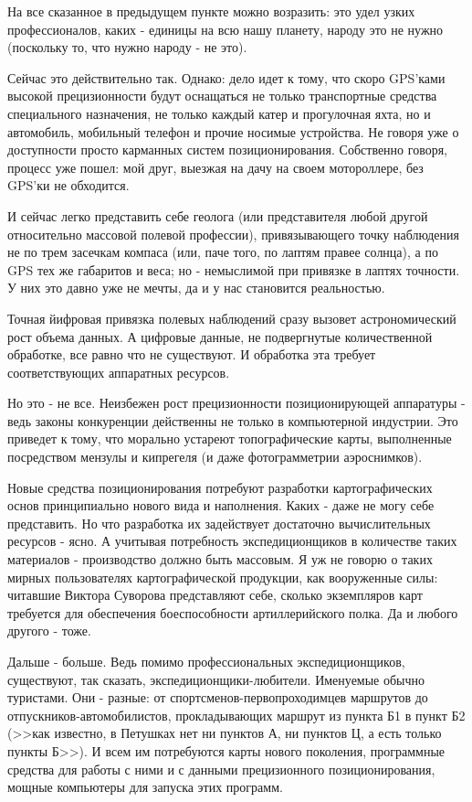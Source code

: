 На все сказанное в предыдущем пункте можно возразить: это удел узких профессионалов, каких - единицы на всю нашу планету, народу это не нужно (поскольку то, что нужно народу - не это).

Сейчас это действительно так. Однако: дело идет к тому, что скоро GPS'ками высокой прецизионности будут оснащаться не только транспортные средства специального назначения, не только каждый катер и прогулочная яхта, но и автомобиль, мобильный телефон и прочие носимые устройства. Не говоря уже о доступности просто карманных систем позиционирования. Собственно говоря, процесс уже пошел: мой друг, выезжая на дачу на своем мотороллере, без GPS'ки не обходится.

И сейчас легко представить себе геолога (или представителя любой другой относительно массовой полевой профессии), привязывающего точку наблюдения не по трем засечкам компаса (или, паче того, по лаптям правее солнца), а по GPS тех же габаритов и веса; но - немыслимой при привязке в лаптях точности. У них это давно уже не мечты, да и у нас становится реальностью.

Точная йифровая привязка полевых наблюдений сразу вызовет астрономический рост объема данных. А цифровые данные, не подвергнутые количественной обработке, все равно что не существуют. И обработка эта требует соответствующих аппаратных ресурсов.

Но это - не все. Неизбежен рост прецизионности позиционирующей аппаратуры - ведь законы конкуренции действенны не только в компьютерной индустрии. Это приведет к тому, что морально устареют топографические карты, выполненные посредством мензулы и кипрегеля (и даже фотограмметрии аэроснимков).

Новые средства позиционирования потребуют разработки картографических основ принципиально нового вида и наполнения. Каких - даже не могу себе представить. Но что разработка их задействует достаточно вычислительных ресурсов - ясно. А учитывая потребность экспедиционщиков в количестве таких материалов - производство должно быть массовым. Я уж не говорю о таких мирных пользователях картографической продукции, как вооруженные силы: читавшие Виктора Суворова представляют себе, сколько экземпляров карт требуется для обеспечения боеспособности артиллерийского полка. Да и любого другого - тоже.

Дальше - больше. Ведь помимо профессиональных экспедиционщиков, существуют, так сказать, экспедиционщики-любители. Именуемые обычно туристами. Они - разные: от спортсменов-первопроходимцев маршрутов до отпускников-автомобилистов, прокладывающих маршрут из пункта Б1 в пункт Б2 (>>как известно, в Петушках нет ни пунктов А, ни пунктов Ц, а есть только пункты Б>>). И всем им потребуются карты нового поколения, программные средства для работы с ними и с данными прецизионного позиционирования, мощные компьютеры для запуска этих программ.

